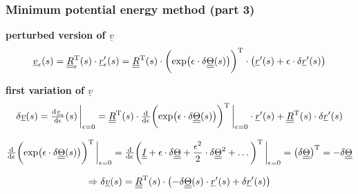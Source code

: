 \begin{frame}
  \frametitle{Minimum potential energy method (part 3)}
  \textbf{perturbed version of $\underline{v}$}
  \begin{displaymath}
    \underline{v}_{\epsilon}(s) =
    \underline{\underline{R}}_{\epsilon}^{\mathrm{T}}(s) \cdot \underline{r}_{\epsilon}^{\prime}(s) =
    \underline{\underline{R}}^{\mathrm{T}}(s) \cdot \biggl( \exp \bigl( \epsilon \cdot \delta \underline{\underline{\Theta}}(s) \bigr) \biggr)^{\mathrm{T}} \cdot \bigl( \underline{r}^{\prime}(s) + \epsilon \cdot \delta \underline{r}^{\prime}(s) \bigr)
  \end{displaymath}
  
  \vspace{0.5em}
  \textbf{first variation of $\underline{v}$}
  \begin{displaymath}
    \label{eq:fist_variation_of_v}
    \delta \underline{v}(s) = 
    \od{\underline{v}_{\epsilon}}{\epsilon}(s) \sVert[3]_{\epsilon=0} =
    \doubleunderline{R}^{\mathrm{T}}(s) \cdot
    \od{}{\epsilon} \biggl( \exp \bigl( \epsilon \cdot \delta \doubleunderline{\Theta}(s) \bigr) \biggr)^{\mathrm{T}} \sVert[3]_{\epsilon=0}
     \cdot \underline{r}^{\prime}(s) +
     \doubleunderline{R}^{\mathrm{T}}(s) \cdot \delta \underline{r}^{\prime}(s)
  \end{displaymath}
  
  \vspace{0.5em}
  \begin{displaymath}
    \od{}{\epsilon} \biggl( \exp \bigl( \epsilon \cdot \delta \doubleunderline{\Theta}(s) \bigr) \biggr)^{\mathrm{T}} \sVert[3]_{\epsilon=0} =
    \od{}{\epsilon} \biggl( \doubleunderline{I} + \epsilon \cdot \delta \doubleunderline{\Theta} + \frac{\epsilon^2}{2} \cdot \delta \doubleunderline{\Theta}^2 + \dots \biggr)^{\mathrm{T}} \sVert[3]_{\epsilon=0} =
    \bigl( \delta \doubleunderline{\Theta} \bigr)^{\mathrm{T}} = -\delta \doubleunderline{\Theta} 
  \end{displaymath}
  
  \vspace{0.5em}
  \begin{displaymath}
    \Rightarrow
    \delta \underline{v}(s) =
    \underline{\underline{R}}^{\mathrm{T}}(s) \cdot
    \bigl( - \delta \underline{\underline{\Theta}}(s) \cdot \underline{r}^{\prime}(s) + \delta \underline{r}^{\prime}(s) \bigr)
  \end{displaymath}
\end{frame}



